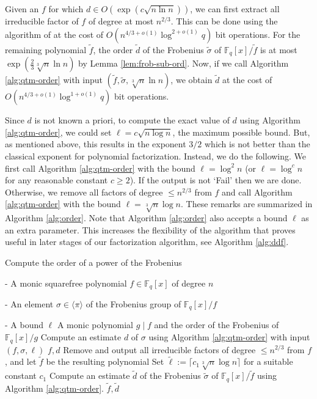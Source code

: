 \documentclass{article}
\theoremstyle{plain}
\theoremstyle{definition}
\newcommand{\algbox}[1]{
	\begin{tcolorbox}[width = 0.8\textwidth, colback = white, arc = 2pt, boxrule = 0.5pt] 
		#1 
	\end{tcolorbox}
}
\newcommand{\lrang}[1]{\langle#1\rangle}
\def\F{\ensuremath{\mathbb{F}}}
\begin{document}
Given an $f$ for which $d \in O(\exp(c\sqrt{n \ln n}))$, we can first extract all irreducible 
factor of $f$ of degree at most $n^{2 / 3}$. This can be done using the algorithm of \cite[\S 
8]{kedlaya2011fast} at the cost of $O(n^{4 / 3 + o(1)}\log^{2 + o(1)}q)$ bit operations. For the 
remaining polynomial $\tilde{f}$, the order $\tilde{d}$ of the Frobenius $\tilde{\sigma}$ of 
$\F_q[x] / \tilde{f}$ is at most $\exp(\frac{2}{3}\sqrt[3]{n} \ln n)$ by Lemma 
\ref{lem:frob-sub-ord}. Now, if we call Algorithm \ref{alg:qtm-order} with input $(\tilde{f}, 
\tilde{\sigma}, \sqrt[3]{n} \ln n)$, we obtain $\tilde{d}$ at the cost of $O(n^{4 / 3 + o(1)}\log^{1 
+ o(1)}q)$ bit operations.

Since $d$ is not known a priori, to compute the exact value of $d$ using Algorithm 
\ref{alg:qtm-order}, we could set $\ell = c\sqrt{n \log n}$, the maximum possible bound. But, as 
mentioned above, this results in the exponent $3 / 2$ which is not better than the classical 
exponent for polynomial factorization. Instead, we do the following. We first call Algorithm 
\ref{alg:qtm-order} with the bound $\ell = \log^2n$ (or $\ell = \log^cn$ for any reasonable constant 
$c \ge 2$). If the output is not `Fail' then we are done. Otherwise, we remove all factors of degree 
$\le n^{2 / 3}$ from $f$ and call Algorithm \ref{alg:qtm-order} with the bound $\ell = \sqrt[3]{n} 
\log n$. These remarks are summarized in Algorithm \ref{alg:order}. Note that Algorithm 
\ref{alg:order} also accepts a bound $\ell$ as an extra parameter. This increases the flexibility 
of the algorithm that proves useful in later stages of our factorization algorithm, see Algorithm 
\ref{alg:ddf}.

\begin{algorithm}[t]
	\caption{Compute the order of a power of the Frobenius}
	\label{alg:order}
	\centering
	\algbox{
	\begin{algorithmic}[1]
		\Require 
		\item[-] A monic squarefree polynomial $f \in \F_q[x]$ of degree $n$
		\item[-] An element $\sigma \in \lrang{\pi}$ of the Frobenius group of $\F_q[x] / f$
		\item[-] A bound $\ell$
		\Ensure A monic polynomial $g \mid f$ and the order of the Frobenius of $\F_q[x] / g$
		\State Compute an estimate $d$ of $\sigma$ using Algorithm \ref{alg:qtm-order} with input 
		$(f, \sigma, \ell)$
		\If {the output is not `Fail'}
			\State \Return $f, d$
		\EndIf
		\State Remove and output all irreducible factors of degree $\le n^{2 / 3}$ from 
		$f$, and let $\tilde{f}$ be the resulting polynomial
		\State Set $\tilde{\ell} := \lceil c_1\sqrt[3]{n} \log n \rceil$ for a suitable constant 
		$c_1$
		\State Compute an estimate $\tilde{d}$ of the Frobenius $\tilde{\sigma}$ of $\F_q[x] / 
		\tilde{f}$ using Algorithm \ref{alg:qtm-order}.
		\State \Return $\tilde{f}, \tilde{d}$
	\end{algorithmic}}
\end{algorithm}
\end{document}
